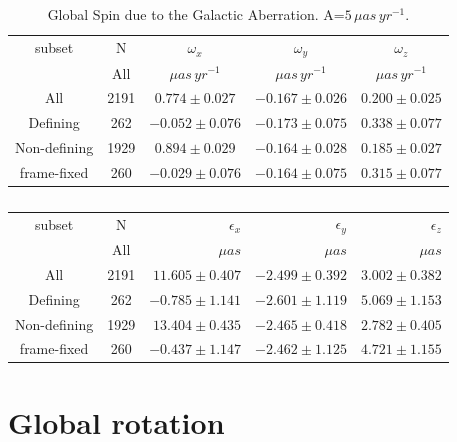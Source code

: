 \documentclass[onecolumn]{aa}   %
\begin{document}
\begin{table}[ht]
\caption{Global Spin due to the Galactic Aberration. A=$5\,\mu as\,yr^{-1}$.}
\centering
\begin{tabular}{c c c c c }
\hline
subset		&N		&  $\omega_x$        	& $\omega_y$         	& $\omega_z$ \\
			&All		& $\mu as\,yr^{-1}$	&$\mu as\, yr^{-1}$	& $\mu as\,yr^{-1}$   \\
\hline
All			&2191	&$ 0.774 \pm 0.027$    &$-0.167 \pm 0.026$    &$0.200 \pm 0.025$ \\
Defining		&262		&$-0.052 \pm 0.076$    &$-0.173 \pm 0.075$    &$0.338 \pm 0.077$ \\
Non-defining	&1929	&$ 0.894 \pm 0.029$    &$-0.164 \pm 0.028$    &$0.185 \pm 0.027$  \\
frame-fixed	&260		&$-0.029 \pm 0.076$    &$-0.164 \pm 0.075$    &$0.315 \pm 0.077$ \\
\hline
\end{tabular}
\label{tab:GAspin}
\end{table}

\begin{table}[ht]
\caption{}
\centering
\begin{tabular}{c c r r r }
\hline
subset		&N		&  $\epsilon_x$        	& $\epsilon_y$         	& $\epsilon_z$ \\
			&All		& $\mu as$		&$\mu as$		& $\mu as$   \\
\hline
All			&2191	&$ 11.605 \pm 0.407$    &$-2.499 \pm 0.392$    &$3.002 \pm 0.382$ \\
Defining		&262		&$ -0.785 \pm 1.141$    &$-2.601 \pm 1.119$    &$5.069 \pm 1.153$ \\
Non-defining	&1929	&$13.404 \pm 0.435$    &$-2.465 \pm 0.418$    &$2.782 \pm 0.405$  \\
frame-fixed	&260		&$-0.437 \pm 1.147$    &$-2.462 \pm 1.125$    &$4.721 \pm 1.155$  \\
\hline
\end{tabular}
\label{tab:GAorientation}
\end{table}

\section{Global rotation}    \label{sec:global-rotation}
\end{document}
